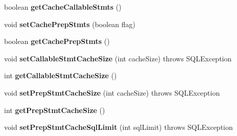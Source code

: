 \begin{DoxyCompactItemize}
boolean {\bfseries get\+Cache\+Callable\+Stmts} ()
\item 
\mbox{\label{classcom_1_1mysql_1_1jdbc_1_1_connection_properties_impl_ae4108d2c9b37580d1750cdf76a274b47}} 
void {\bfseries set\+Cache\+Prep\+Stmts} (boolean flag)
\item 
\mbox{\label{classcom_1_1mysql_1_1jdbc_1_1_connection_properties_impl_a52b98294a221f93140b315bd6b56621f}} 
boolean {\bfseries get\+Cache\+Prep\+Stmts} ()
\item 
\mbox{\label{classcom_1_1mysql_1_1jdbc_1_1_connection_properties_impl_ad2dee04004b61040f0acb335e28857bc}} 
void {\bfseries set\+Callable\+Stmt\+Cache\+Size} (int cache\+Size)  throws S\+Q\+L\+Exception 
\item 
\mbox{\label{classcom_1_1mysql_1_1jdbc_1_1_connection_properties_impl_a5a768eeca26e2770e1bb249b33f4b235}} 
int {\bfseries get\+Callable\+Stmt\+Cache\+Size} ()
\item 
\mbox{\label{classcom_1_1mysql_1_1jdbc_1_1_connection_properties_impl_ab8974ffa25d9425fb57112fc56c343f3}} 
void {\bfseries set\+Prep\+Stmt\+Cache\+Size} (int cache\+Size)  throws S\+Q\+L\+Exception 
\item 
\mbox{\label{classcom_1_1mysql_1_1jdbc_1_1_connection_properties_impl_ad4d84a917edfc2dc361c5d4388f35cbd}} 
int {\bfseries get\+Prep\+Stmt\+Cache\+Size} ()
\item 
\mbox{\label{classcom_1_1mysql_1_1jdbc_1_1_connection_properties_impl_a9d112ec3f8ab5cd02803fda793b289d2}} 
void {\bfseries set\+Prep\+Stmt\+Cache\+Sql\+Limit} (int sql\+Limit)  throws S\+Q\+L\+Exception 
\item 
\mbox{\label{classcom_1_1mysql_1_1jdbc_1_1_connection_properties_impl_a42dcb74f2f1a8495758b992688d9dd1f}} 

\end{DoxyCompactItemize}
